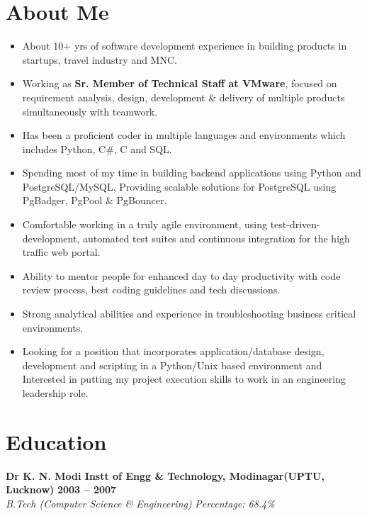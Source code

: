 \documentclass[margin,line]{resume}
\begin{document}
\begin{resume}
    \section{\mysidestyle About Me}
      \begin{itemize}
        \item About 10+ yrs of software development experience in building products in startups, travel industry and MNC.
		\item Working as \textbf{Sr. Member of Technical Staff at VMware}, focused on requirement analysis, design, development \& delivery of multiple products simultaneously with teamwork.
		\item Has been a proficient coder in multiple languages and environments which includes Python, C\#, C and SQL.
		\item Spending most of my time in building backend applications using Python and PostgreSQL/MySQL, Providing scalable solutions for PostgreSQL using PgBadger, PgPool \& PgBouncer. 
        \item Comfortable working in a truly agile environment, using test-driven-development, automated test suites and continuous integration for the high traffic web portal.
		\item Ability to mentor people for enhanced day to day productivity with code review process, best coding guidelines and tech discussions.
		\item Strong analytical abilities and experience in troubleshooting business critical environments.
	    \item Looking for a position that incorporates application/database design, development and scripting in a Python/Unix based environment and Interested in putting my project execution skills to work in an engineering leadership role.
	\end{itemize}
    
    \section{\mysidestyle Education}

    \textbf{Dr K. N. Modi Instt of Engg \& Technology, Modinagar(UPTU, Lucknow)} \hfill \textbf{2003 -- 2007}\vspace{0mm}\\\vspace{0mm}%
    \textsl{B.Tech (Computer Science \& Engineering)} \hfill \textsl{Percentage: 68.4\%}


\end{resume}
\end{document}
